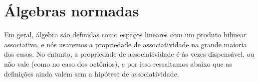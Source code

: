 \begin{comment}
	\end{equation*}
e, como $\lim_{v \conv 0} \D f_0(p) \cdot v + r_0(v) = 0$ e $\D f_0(p) \cdot \frac{v}{\nor{v}}$ é limitado,
	\begin{align*}
	\lim_{v \conv 0} &\frac{r_1(\D f_0(p) \cdot v + r_0(v))}{\nor{v}} \\
		&= \lim_{v \conv 0} \frac{r_1(\D f_0(p) \cdot v + r_0(v))}{\nor{\D f_0(p) \cdot v + r_0(v)}} \frac{\nor{\D f_0(p) \cdot v + r_0(v)}}{\nor{v}}\\
		&= \lim_{v \conv 0} \frac{r_1(\D f_0(p) \cdot v + r_0(v))}{\nor{\D f_0(p) \cdot v + r_0(v)}} \nor{\D f_0(p) \cdot \frac{v}{\nor{v}}+ \frac{r_0(v)}{\nor{v}}} = 0.
	\end{align*}
Logo
	\begin{equation*}
	\lim_{v \conv 0} \frac{(f_1 \circ f_0)(p+v) - (f_1 \circ f_0)(p) - \big(\D f_1(f_0(p)) \circ \D f_0(p)\big) \cdot v}{\nor{v}} = 0,
	\end{equation*}
e concluímos que $\D f_1(f_0(p)) \circ \D f_0(p)$ é a diferencial de $f_1 \circ f_0$ em $p$.
\end{proof}

\end{comment}


















\section{Álgebras normadas}

Em geral, álgebra são definidas como espaços lineares com um produto bilinear associativo, e nós usaremos a propriedade de associatividade na grande maioria dos casos. No entanto, a propriedade de associatividade é às vezes dispensável, ou não vale (como no caso dos octônios), e por isso ressaltamos abaixo que as definições ainda valem sem a hipótese de associatividade.

